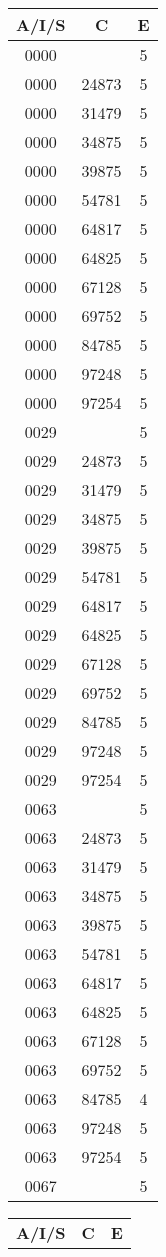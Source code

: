 {{        \centering
        \begin{tabular}{|c|c||c|}
        \hline
        \bf A/I/S & \bf C & \bf E \\
        \hline
0000& &5\\ 0000&24873&5\\ 0000&31479&5\\ 0000&34875&5\\ 0000&39875&5\\ 0000&54781&5\\ 0000&64817&5\\ 0000&64825&5\\ 0000&67128&5\\ 0000&69752&5\\ 0000&84785&5\\ 0000&97248&5\\ 0000&97254&5\\ 0029& &5\\ 0029&24873&5\\ 0029&31479&5\\ 0029&34875&5\\ 0029&39875&5\\ 0029&54781&5\\ 0029&64817&5\\ 0029&64825&5\\ 0029&67128&5\\ 0029&69752&5\\ 0029&84785&5\\ 0029&97248&5\\ 0029&97254&5\\ 0063& &5\\ 0063&24873&5\\ 0063&31479&5\\ 0063&34875&5\\ 0063&39875&5\\ 0063&54781&5\\ 0063&64817&5\\ 0063&64825&5\\ 0063&67128&5\\ 0063&69752&5\\ 0063&84785&4\\ 0063&97248&5\\ 0063&97254&5\\ 0067& &5\\ 
        \hline
        \end{tabular}
        \quad
        \begin{tabular}{|c|c||c|}
        \hline
        \bf A/I/S & \bf C & \bf E \\

\end{tabular}}}
